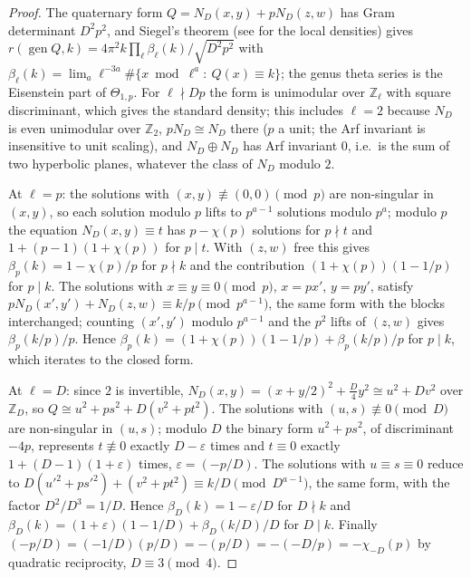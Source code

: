 \documentclass[11pt]{amsart}
\theoremstyle{remark}
\newcommand{\Z}{\mathbb{Z}}
\newcommand{\e}{\varepsilon}
\DeclareMathOperator{\gen}{gen}
\begin{document}
\begin{proof}
The quaternary form $Q=N_D(x,y)+pN_D(z,w)$ has Gram determinant $D^2p^2$, and Siegel's theorem \cite{Siegel} (see \cite[Chapter~6]{Kitaoka} for the local densities) gives $r(\gen Q,k)=4\pi^2k\prod_\ell\beta_\ell(k)/\sqrt{D^2p^2}$ with $\beta_\ell(k)=\lim_a\ell^{-3a}\#\{x\bmod\ell^a:\ Q(x)\equiv k\}$; the genus theta series is the Eisenstein part of $\Theta_{1,p}$. For $\ell\nmid Dp$ the form is unimodular over $\Z_\ell$ with square discriminant, which gives the standard density; this includes $\ell=2$ because $N_D$ is even unimodular over $\Z_2$, $pN_D\cong N_D$ there ($p$ a unit; the Arf invariant is insensitive to unit scaling), and $N_D\oplus N_D$ has Arf invariant $0$, i.e.\ is the sum of two hyperbolic planes, whatever the class of $N_D$ modulo $2$.

At $\ell=p$: the solutions with $(x,y)\not\equiv(0,0)\pmod p$ are non-singular in $(x,y)$, so each solution modulo $p$ lifts to $p^{a-1}$ solutions modulo $p^a$; modulo $p$ the equation $N_D(x,y)\equiv t$ has $p-\chi(p)$ solutions for $p\nmid t$ and $1+(p-1)(1+\chi(p))$ for $p\mid t$. With $(z,w)$ free this gives $\beta_p(k)=1-\chi(p)/p$ for $p\nmid k$ and the contribution $(1+\chi(p))(1-1/p)$ for $p\mid k$. The solutions with $x\equiv y\equiv0\pmod p$, $x=px'$, $y=py'$, satisfy $pN_D(x',y')+N_D(z,w)\equiv k/p\pmod{p^{a-1}}$, the same form with the blocks interchanged; counting $(x',y')$ modulo $p^{a-1}$ and the $p^2$ lifts of $(z,w)$ gives $\beta_p(k/p)/p$. Hence $\beta_p(k)=(1+\chi(p))(1-1/p)+\beta_p(k/p)/p$ for $p\mid k$, which iterates to the closed form.

At $\ell=D$: since $2$ is invertible, $N_D(x,y)=(x+y/2)^2+\frac D4y^2\cong u^2+Dv^2$ over $\Z_D$, so $Q\cong u^2+ps^2+D(v^2+pt^2)$. The solutions with $(u,s)\not\equiv0\pmod D$ are non-singular in $(u,s)$; modulo $D$ the binary form $u^2+ps^2$, of discriminant $-4p$, represents $t\not\equiv0$ exactly $D-\e$ times and $t\equiv0$ exactly $1+(D-1)(1+\e)$ times, $\e=(-p/D)$. The solutions with $u\equiv s\equiv0$ reduce to $D(u'^2+ps'^2)+(v^2+pt^2)\equiv k/D\pmod{D^{a-1}}$, the same form, with the factor $D^2/D^3=1/D$. Hence $\beta_D(k)=1-\e/D$ for $D\nmid k$ and $\beta_D(k)=(1+\e)(1-1/D)+\beta_D(k/D)/D$ for $D\mid k$. Finally $(-p/D)=(-1/D)(p/D)=-(p/D)=-(-D/p)=-\chi_{-D}(p)$ by quadratic reciprocity, $D\equiv3\pmod4$.
\end{proof}
\end{document}
